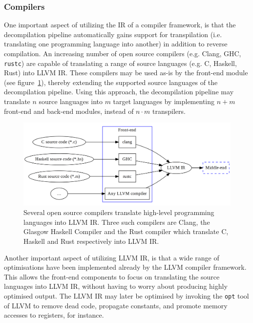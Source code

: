 
\subsubsection{Compilers}
\label{sec:design_compilers}

One important aspect of utilizing the IR of a compiler framework, is that the decompilation pipeline automatically gains support for transpilation (i.e. translating one programming language into another) in addition to reverse compilation. An increasing number of open source compilers (e.g. Clang, GHC, \texttt{rustc}) are capable of translating a range of source languages (e.g. C, Haskell, Rust) into LLVM IR. These compilers may be used as-is by the front-end module (see figure~\ref{fig:front-end_source}), thereby extending the supported source languages of the decompilation pipeline. Using this approach, the decompilation pipeline may translate $ n $ source languages into $ m $ target languages by implementing $ n + m $ front-end and back-end modules, instead of $ n \cdot m $ transpilers.

\begin{figure}[htbp]
	\begin{center}
		\includegraphics[width=\textwidth]{inc/6_design/front-end_source.png}
		\caption{Several open source compilers translate high-level programming languages into LLVM IR. Three such compilers are Clang, the Glasgow Haskell Compiler and the Rust compiler which translate C, Haskell and Rust respectively into LLVM IR.}
		\label{fig:front-end_source}
	\end{center}
\end{figure}

Another important aspect of utilizing LLVM IR, is that a wide range of optimisations have been implemented already by the LLVM compiler framework. This allows the front-end components to focus on translating the source languages into LLVM IR, without having to worry about producing highly optimised output. The LLVM IR may later be optimised by invoking the \texttt{opt} tool of LLVM to remove dead code, propagate constants, and promote memory accesses to registers, for instance.
